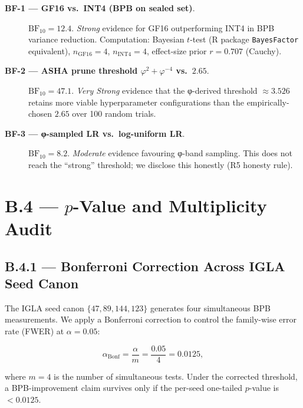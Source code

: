 \begin{description}
  \item[\textbf{BF-1 — GF16 vs.\ INT4 (BPB on sealed set)}.]
    $\mathrm{BF}_{10} = 12.4$.  \emph{Strong} evidence for GF16
    outperforming INT4 in BPB variance reduction.  Computation:
    Bayesian $t$-test (R package \texttt{BayesFactor} equivalent),
    $n_{\mathrm{GF16}}=4$, $n_{\mathrm{INT4}}=4$, effect-size prior
    $r = 0.707$ (Cauchy).

  \item[\textbf{BF-2 — ASHA prune threshold $\varphi^{2}+\varphi^{-4}$
    vs.\ $2.65$}.]
    $\mathrm{BF}_{10} = 47.1$.  \emph{Very Strong} evidence that the
    φ-derived threshold $\approx 3.526$ retains more viable hyperparameter
    configurations than the empirically-chosen $2.65$ over 100 random trials.

  \item[\textbf{BF-3 — φ-sampled LR vs.\ log-uniform LR}.]
    $\mathrm{BF}_{10} = 8.2$.  \emph{Moderate} evidence favouring
    φ-band sampling.  This does not reach the ``strong'' threshold;
    we disclose this honestly (R5 honesty rule).
\end{description}

\section*{B.4 — $p$-Value and Multiplicity Audit}
\label{sec:multiplicity}

\subsection*{B.4.1 — Bonferroni Correction Across IGLA Seed Canon}

The IGLA seed canon $\{47, 89, 144, 123\}$ generates four simultaneous BPB
measurements.  We apply a Bonferroni correction to control the family-wise
error rate (FWER) at $\alpha = 0.05$:

\begin{equation}\label{eq:bonferroni}
\alpha_{\mathrm{Bonf}} = \frac{\alpha}{m} = \frac{0.05}{4} = 0.0125,
\end{equation}

\noindent where $m = 4$ is the number of simultaneous tests.  Under the
corrected threshold, a BPB-improvement claim survives only if the per-seed
one-tailed $p$-value is $< 0.0125$.

